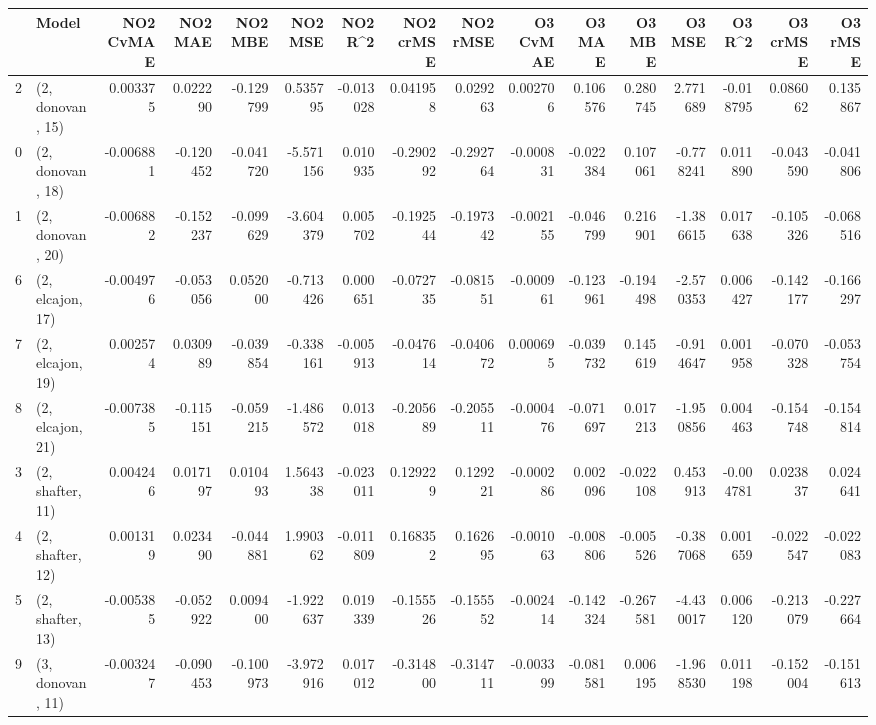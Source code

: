 \begin{tabular}{llrrrrrrrrrrrrrr}
\toprule
{} &             Model &  NO2 CvMAE &   NO2 MAE &   NO2 MBE &    NO2 MSE &   NO2 R\textasciicircum2 &  NO2 crMSE &  NO2 rMSE &  O3 CvMAE &    O3 MAE &    O3 MBE &     O3 MSE &    O3 R\textasciicircum2 &  O3 crMSE &   O3 rMSE \\
\midrule
2  &  (2, donovan, 15) &   0.003375 &  0.022290 & -0.129799 &   0.535795 & -0.013028 &   0.041958 &  0.029263 &  0.002706 &  0.106576 &  0.280745 &   2.771689 & -0.018795 &  0.086062 &  0.135867 \\
0  &  (2, donovan, 18) &  -0.006881 & -0.120452 & -0.041720 &  -5.571156 &  0.010935 &  -0.290292 & -0.292764 & -0.000831 & -0.022384 &  0.107061 &  -0.778241 &  0.011890 & -0.043590 & -0.041806 \\
1  &  (2, donovan, 20) &  -0.006882 & -0.152237 & -0.099629 &  -3.604379 &  0.005702 &  -0.192544 & -0.197342 & -0.002155 & -0.046799 &  0.216901 &  -1.386615 &  0.017638 & -0.105326 & -0.068516 \\
6  &  (2, elcajon, 17) &  -0.004976 & -0.053056 &  0.052000 &  -0.713426 &  0.000651 &  -0.072735 & -0.081551 & -0.000961 & -0.123961 & -0.194498 &  -2.570353 &  0.006427 & -0.142177 & -0.166297 \\
7  &  (2, elcajon, 19) &   0.002574 &  0.030989 & -0.039854 &  -0.338161 & -0.005913 &  -0.047614 & -0.040672 &  0.000695 & -0.039732 &  0.145619 &  -0.914647 &  0.001958 & -0.070328 & -0.053754 \\
8  &  (2, elcajon, 21) &  -0.007385 & -0.115151 & -0.059215 &  -1.486572 &  0.013018 &  -0.205689 & -0.205511 & -0.000476 & -0.071697 &  0.017213 &  -1.950856 &  0.004463 & -0.154748 & -0.154814 \\
3  &  (2, shafter, 11) &   0.004246 &  0.017197 &  0.010493 &   1.564338 & -0.023011 &   0.129229 &  0.129221 & -0.000286 &  0.002096 & -0.022108 &   0.453913 & -0.004781 &  0.023837 &  0.024641 \\
4  &  (2, shafter, 12) &   0.001319 &  0.023490 & -0.044881 &   1.990362 & -0.011809 &   0.168352 &  0.162695 & -0.001063 & -0.008806 & -0.005526 &  -0.387068 &  0.001659 & -0.022547 & -0.022083 \\
5  &  (2, shafter, 13) &  -0.005385 & -0.052922 &  0.009400 &  -1.922637 &  0.019339 &  -0.155526 & -0.155552 & -0.002414 & -0.142324 & -0.267581 &  -4.430017 &  0.006120 & -0.213079 & -0.227664 \\
9  &  (3, donovan, 11) &  -0.003247 & -0.090453 & -0.100973 &  -3.972916 &  0.017012 &  -0.314800 & -0.314711 & -0.003399 & -0.081581 &  0.006195 &  -1.968530 &  0.011198 & -0.152004 & -0.151613 \\

\end{tabular}
